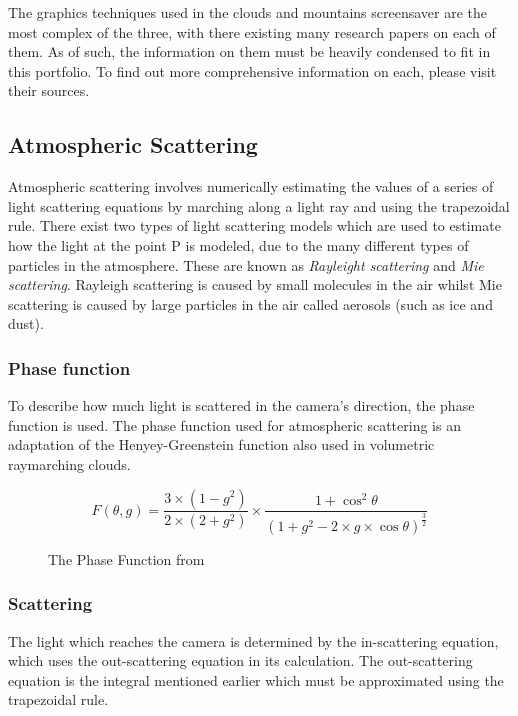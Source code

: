 \documentclass[10pt, openany]{book}
\begin{document}
The graphics techniques used in the clouds and mountains screensaver are the most complex of the three, with there existing many research papers on each of them. As of such, the information on them must be heavily condensed to fit in this portfolio. To find out more comprehensive information on each, please visit their sources. 

\subsection{Atmospheric Scattering}

Atmospheric scattering involves numerically estimating the values of a series of light scattering equations by marching along a light ray and using the trapezoidal rule. There exist two types of light scattering models which are used to estimate how the light at the point P is modeled, due to the many different types of particles in the atmosphere. These are known as \textit{Rayleight scattering} and \textit{Mie scattering}. Rayleigh scattering is caused by small molecules in the air whilst Mie scattering is caused by large particles in the air called aerosols (such as ice and dust). \citep{gpugems2}

\subsubsection{Phase function}

To describe how much light is scattered in the camera's direction, the phase function is used. The phase function used for atmospheric scattering is an adaptation of the Henyey-Greenstein function also used in volumetric raymarching clouds.

\begin{figure}[H]
	\centering
	\[F(\theta,g) = \frac{3 \times (1 - g^2)}{2 \times (2 + g^2)} \times \frac{1 + \cos^2\theta}{(1 + g^2 - 2 \times g \times \cos\theta)^\frac{3}{2}}\]
	\caption{The Phase Function from \citep{gpugems2}}
\end{figure}

\subsubsection{Scattering}

The light which reaches the camera is determined by the in-scattering equation, which uses the out-scattering equation in its calculation. The out-scattering equation is the integral mentioned earlier which must be approximated using the trapezoidal rule.
\end{document}
